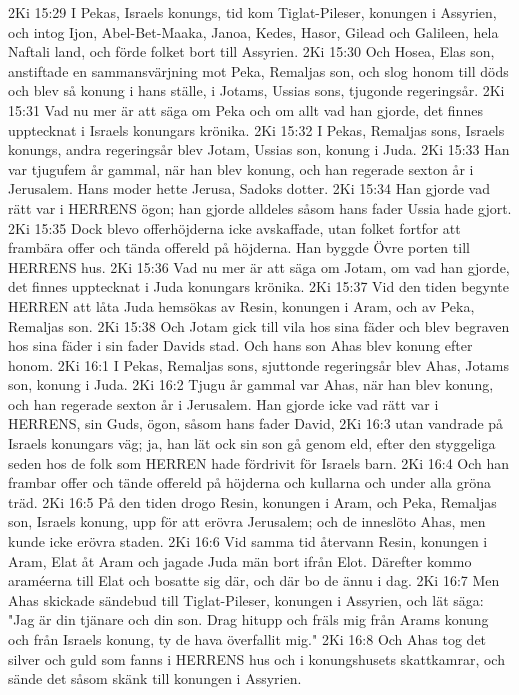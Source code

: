 2Ki 15:29  I Pekas, Israels konungs, tid kom Tiglat-Pileser, konungen i Assyrien, och intog Ijon, Abel-Bet-Maaka, Janoa, Kedes, Hasor, Gilead och Galileen, hela Naftali land, och förde folket bort till Assyrien.
2Ki 15:30  Och Hosea, Elas son, anstiftade en sammansvärjning mot Peka, Remaljas son, och slog honom till döds och blev så konung i hans ställe, i Jotams, Ussias sons, tjugonde regeringsår.
2Ki 15:31  Vad nu mer är att säga om Peka och om allt vad han gjorde, det finnes upptecknat i Israels konungars krönika.
2Ki 15:32  I Pekas, Remaljas sons, Israels konungs, andra regeringsår blev Jotam, Ussias son, konung i Juda.
2Ki 15:33  Han var tjugufem år gammal, när han blev konung, och han regerade sexton år i Jerusalem. Hans moder hette Jerusa, Sadoks dotter.
2Ki 15:34  Han gjorde vad rätt var i HERRENS ögon; han gjorde alldeles såsom hans fader Ussia hade gjort.
2Ki 15:35  Dock blevo offerhöjderna icke avskaffade, utan folket fortfor att frambära offer och tända offereld på höjderna. Han byggde Övre porten till HERRENS hus.
2Ki 15:36  Vad nu mer är att säga om Jotam, om vad han gjorde, det finnes upptecknat i Juda konungars krönika.
2Ki 15:37  Vid den tiden begynte HERREN att låta Juda hemsökas av Resin, konungen i Aram, och av Peka, Remaljas son.
2Ki 15:38  Och Jotam gick till vila hos sina fäder och blev begraven hos sina fäder i sin fader Davids stad. Och hans son Ahas blev konung efter honom.
2Ki 16:1  I Pekas, Remaljas sons, sjuttonde regeringsår blev Ahas, Jotams son, konung i Juda.
2Ki 16:2  Tjugu år gammal var Ahas, när han blev konung, och han regerade sexton år i Jerusalem. Han gjorde icke vad rätt var i HERRENS, sin Guds, ögon, såsom hans fader David,
2Ki 16:3  utan vandrade på Israels konungars väg; ja, han lät ock sin son gå genom eld, efter den styggeliga seden hos de folk som HERREN hade fördrivit för Israels barn.
2Ki 16:4  Och han frambar offer och tände offereld på höjderna och kullarna och under alla gröna träd.
2Ki 16:5  På den tiden drogo Resin, konungen i Aram, och Peka, Remaljas son, Israels konung, upp för att erövra Jerusalem; och de inneslöto Ahas, men kunde icke erövra staden.
2Ki 16:6  Vid samma tid återvann Resin, konungen i Aram, Elat åt Aram och jagade Juda män bort ifrån Elot. Därefter kommo araméerna till Elat och bosatte sig där, och där bo de ännu i dag.
2Ki 16:7  Men Ahas skickade sändebud till Tiglat-Pileser, konungen i Assyrien, och lät säga: "Jag är din tjänare och din son. Drag hitupp och fräls mig från Arams konung och från Israels konung, ty de hava överfallit mig."
2Ki 16:8  Och Ahas tog det silver och guld som fanns i HERRENS hus och i konungshusets skattkamrar, och sände det såsom skänk till konungen i Assyrien.
